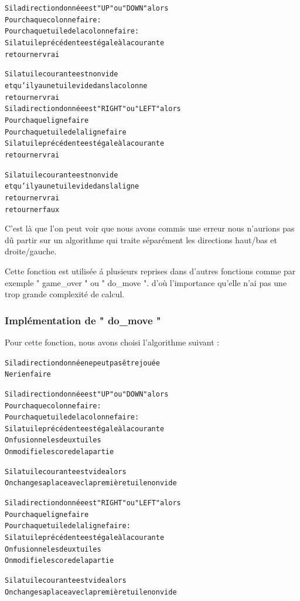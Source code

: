 \documentclass[12pt]{article}
\begin{document}
\begin{alltt}
{\color{gray}
Si la direction donnée est " UP " ou " DOWN " alors
    Pour chaque colonne faire :
        Pour chaque tuile de la colonne faire :
            Si la tuile précédente est égale à la courante
                retourner vrai
 		
            Si la tuile courante est non vide 
                   et qu'il y a une tuile vide dans la colonne
                retourner vrai	    	
Si la direction donnée est " RIGHT " ou " LEFT " alors
    Pour chaque ligne faire 
        Pour chaque tuile de la ligne faire
            Si la tuile précédente est égale à la courante
                retourner vrai
 		
            Si la tuile courante est non vide
                   et qu'il y a une tuile vide dans la ligne
                retourner vrai	    	
retourner faux
}
\end{alltt}

C'est là que l'on peut voir que nous avons commis une erreur nous n'aurions
pas d\^u partir sur un algorithme qui traite séparément les directions haut/bas et droite/gauche.

Cette fonction est utilisée \'a plusieurs reprises dans d'autres fonctions
comme par exemple " game\_over " ou " do\_move ". d'o\`u
l'importance qu'elle n'ai pas une trop grande complexité de calcul.

\subsubsection{Implémentation de " do\_move "}
Pour cette fonction, nous avons choisi l'algorithme suivant :
\begin{alltt}
{\color{gray}
Si la direction donnée ne peut pas être jouée
    Ne rien faire
     
Si la direction donnée est " UP " ou " DOWN " alors
    Pour chaque colonne faire :
        Pour chaque tuile de la colonne faire :
            Si la tuile précédente est égale à la courante
                On fusionne les deux tuiles
                On modifie le score de la partie
            
            Si la tuile courante est vide alors
            	On change sa place avec la première tuile non vide
            	
Si la direction donnée est " RIGHT " ou " LEFT " alors
    Pour chaque ligne faire 
        Pour chaque tuile de la ligne faire :
            Si la tuile précédente est égale à la courante
                On fusionne les deux tuiles
                On modifie le score de la partie
            
            Si la tuile courante est vide alors
            	On change sa place avec la première tuile non vide
}
\end{alltt}
\end{document}
